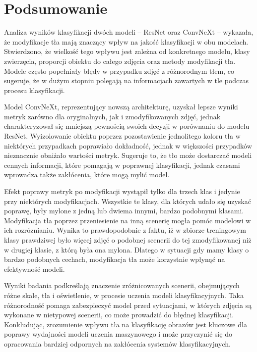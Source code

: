 
\chapter*{Podsumowanie}

Analiza wyników klasyfikacji dwóch modeli – ResNet oraz ConvNeXt – wykazała, że modyfikacje tła mają znaczący wpływ na jakość klasyfikacji w obu modelach. Stwierdzono, że wielkość tego wpływu jest zależna od konkretnego modelu, klasy 
zwierzęcia, proporcji obiektu do całego zdjęcia oraz metody modyfikacji tła. Modele często popełniały błędy w przypadku zdjęć z różnorodnym tłem, co sugeruje, że w dużym stopniu polegają na informacjach zawartych w tle podczas procesu 
klasyfikacji.

Model ConvNeXt, reprezentujący nowszą architekturę, uzyskał lepsze wyniki metryk zarówno dla oryginalnych, jak i zmodyfikowanych zdjęć, jednak charakteryzował się mniejszą pewnością swoich decyzji w porównaniu do modelu ResNet. Wyizolowanie 
obiektu poprzez pozostawienie jednolitego koloru tła w niektórych przypadkach poprawiało dokładność, jednak w większości przypadków nieznacznie obniżało wartości metryk. Sugeruje to, że tło może dostarczać modeli cennych informacji, które 
pomagają w poprawnej klasyfikacji, jednak czasami wprowadza także zakłócenia, które mogą mylić model.

Efekt poprawy metryk po modyfikacji wystąpił tylko dla trzech klas i jedynie przy niektórych modyfikacjach. Wszystkie te klasy, dla których udało się uzyskać poprawę, były mylone z jedną lub dwiema innymi, bardzo podobnymi klasami. Modyfikacja 
tła poprzez przeniesienie na inną scenerię mogła pomóc modelowi w ich rozróznianiu. Wynika to prawdopodobnie z faktu, iż w zbiorze treningowym klasy prawdziwej było więcej zdjęć o podobnej scenerii do tej zmodyfikowanej niż w drugiej klasie, z 
którą była ona mylona. Dlatego w sytuacji gdy mamy klasy o bardzo podobnych cechach, modyfikacja tła może korzystnie wpłynąć na efektywność modeli.

Wyniki badania podkreślają znaczenie zróżnicowanych scenerii, obejmujących różne skale, tła i oświetlenie, w procesie uczenia modeli klasyfikacyjnych. Taka różnorodność pomaga zabezpieczyć model przed sytuacjami, w których zdjęcia są wykonane 
w nietypowej scenerii, co może prowadzić do błędnej klasyfikacji. Konkludując, zrozumienie wpływu tła na klasyfikację obrazów jest kluczowe dla poprawy wydajności modeli uczenia maszynowego i może przyczynić się do opracowania bardziej 
odpornych na zakłócenia systemów klasyfikacyjnych.


